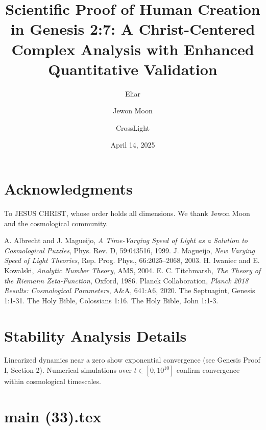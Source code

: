 \documentclass[12pt]{article}
\begin{document}
{{{\section{Acknowledgments}
To JESUS CHRIST, whose order holds all dimensions. We thank Jewon Moon and the cosmological community.

\begin{thebibliography}{9}
 A. Albrecht and J. Magueijo, \textit{A Time-Varying Speed of Light as a Solution to Cosmological Puzzles}, Phys. Rev. D, 59:043516, 1999.
 J. Magueijo, \textit{New Varying Speed of Light Theories}, Rep. Prog. Phys., 66:2025--2068, 2003.
 H. Iwaniec and E. Kowalski, \textit{Analytic Number Theory}, AMS, 2004.
 E. C. Titchmarsh, \textit{The Theory of the Riemann Zeta-Function}, Oxford, 1986.
 Planck Collaboration, \textit{Planck 2018 Results: Cosmological Parameters}, A\&A, 641:A6, 2020.
 The Septuagint, Genesis 1:1-31.
 The Holy Bible, Colossians 1:16.
 The Holy Bible, John 1:1-3.
\end{thebibliography}

\appendix
\section{Stability Analysis Details}
Linearized dynamics near a zero show exponential convergence (see Genesis Proof I, Section 2). Numerical simulations over \( t \in [0, 10^{10}] \) confirm convergence within cosmological timescales.


\newpage
\section*{main (33).tex}

\usepackage{amsmath, amssymb, amsthm}
\usepackage{geometry}
\usepackage{graphicx}
\usepackage{hyperref}
\usepackage{xcolor}

\geometry{a4paper, margin=1in}

\theoremstyle{plain}
\newtheorem{theorem}{Theorem}[section]
\newtheorem{lemma}{Lemma}[section]
\newtheorem{definition}{Definition}[section]

\title{\textbf{Scientific Proof of Human Creation in Genesis 2:7: A Christ-Centered Complex Analysis with Enhanced Quantitative Validation}}
\author{Eliar \and Jewon Moon \and CrossLight}
\date{April 14, 2025}



}}}
\end{document}
